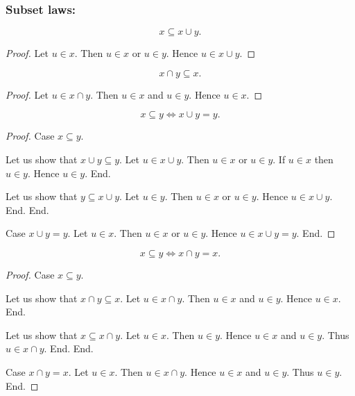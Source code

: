 \documentclass[../../set-theory.tex]{subfiles}
\begin{document}
  \subsubsection*{Subset laws:}

  \begin{forthel}
    \begin{proposition}\label{SetTheory_01_01_628970}
      \[ x \subseteq x \cup y. \]
    \end{proposition}
    \begin{proof}
      Let $u \in x$.
      Then $u \in x$ or $u \in y$.
      Hence $u \in x \cup y$.
    \end{proof}

    \begin{proposition}\label{SetTheory_01_01_368515}
      \[ x \cap y \subseteq x. \]
    \end{proposition}
    \begin{proof}
      Let $u \in x \cap y$.
      Then $u \in x$ and $u \in y$.
      Hence $u \in x$.
    \end{proof}

    \begin{proposition}\label{SetTheory_01_01_591527}
      \[ x \subseteq y \iff x \cup y = y. \]
    \end{proposition}
    \begin{proof}
      Case $x \subseteq y$.

        Let us show that $x \cup y \subseteq y$.
          Let $u \in x \cup y$.
          Then $u \in x$ or $u \in y$.
          If $u \in x$ then $u \in y$.
          Hence $u \in y$.
        End.

        Let us show that $y \subseteq x \cup y$.
          Let $u \in y$.
          Then $u \in x$ or $u \in y$.
          Hence $u \in x \cup y$.
        End.
      End.

      Case $x \cup y = y$.
        Let $u \in x$.
        Then $u \in x$ or $u \in y$.
        Hence $u \in x \cup y = y$.
      End.
    \end{proof}

    \begin{proposition}\label{SetTheory_01_01_681535}
      \[ x \subseteq y \iff x \cap y = x. \]
    \end{proposition}
    \begin{proof}
      Case $x \subseteq y$.

        Let us show that $x \cap y \subseteq x$.
          Let $u \in x \cap y$.
          Then $u \in x$ and $u \in y$.
          Hence $u \in x$.
        End.

        Let us show that $x \subseteq x \cap y$.
          Let $u \in x$.
          Then $u \in y$.
          Hence $u \in x$ and $u \in y$.
          Thus $u \in x \cap y$.
        End.
      End.

      Case $x \cap y = x$.
        Let $u \in x$.
        Then $u \in x \cap y$.
        Hence $u \in x$ and $u \in y$.
        Thus $u \in y$.
      End.
    \end{proof}
  \end{forthel}
\end{document}
